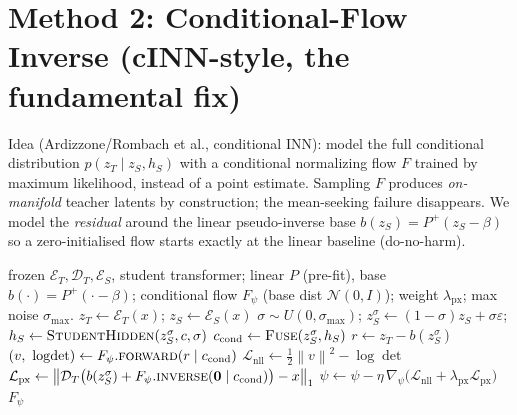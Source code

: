 \documentclass[11pt,a4paper]{article}
\newcommand{\N}{\mathcal{N}}
\newcommand{\Enc}{\mathcal{E}}
\newcommand{\Dec}{\mathcal{D}}
\newcommand{\norm}[1]{\left\lVert #1 \right\rVert}
\newcommand{\zT}{z_{T}}
\newcommand{\zS}{z_{S}}
\newcommand{\hS}{h_{S}}
\begin{document}
\section{Method 2: Conditional-Flow Inverse (cINN-style, the fundamental fix)}
\label{sec:flow}

Idea (Ardizzone/Rombach et al., conditional INN): model the full conditional distribution
$p(\zT\mid\zS,\hS)$ with a conditional normalizing flow $F$ trained by maximum likelihood,
instead of a point estimate. Sampling $F$ produces \emph{on-manifold} teacher latents by
construction; the mean-seeking failure disappears. We model the \emph{residual} around the
linear pseudo-inverse base $b(\zS)=P^{+}(\zS-\beta)$ so a zero-initialised flow starts exactly
at the linear baseline (do-no-harm).

\begin{algorithm}[h]
\caption{Conditional-Flow Inverse --- offline training (NLL)}
\label{alg:flow-train}
\begin{algorithmic}[1]
\Require frozen $\Enc_T,\Dec_T,\Enc_S$, student transformer; linear $P$ (pre-fit),
base $b(\cdot)=P^{+}(\cdot-\beta)$; conditional flow $F_\psi$ (base dist $\N(0,I)$);
weight $\lambda_{\mathrm{px}}$; max noise $\sigma_{\max}$.
  \State $\zT \gets \Enc_T(x)$; \quad $\zS \gets \Enc_S(x)$
  \State $\sigma\sim U(0,\sigma_{\max})$; \quad $\zS^{\sigma}\gets(1-\sigma)\zS+\sigma\varepsilon$;
         \quad $\hS \gets \textsc{StudentHidden}(\zS^{\sigma},c,\sigma)$
  \State $c_{\mathrm{cond}} \gets \textsc{Fuse}(\zS^{\sigma}, \hS)$ 
  \State $r \gets \zT - b(\zS^{\sigma})$ 
  \State $(v,\ \log\!\det) \gets F_\psi.\textsc{forward}(r \mid c_{\mathrm{cond}})$
  \State $\mathcal{L}_{\mathrm{nll}} \gets \tfrac{1}{2}\norm{v}^2 - \log\!\det$
         \Comment{$-\log p_\psi(\zT\mid\zS,\hS)$ up to const}
  \State $\mathcal{L}_{\mathrm{px}} \gets \norm{\Dec_T\big(b(\zS^{\sigma})+F_\psi.\textsc{inverse}(\mathbf{0}\mid c_{\mathrm{cond}})\big)-x}_1$
  \State $\psi \gets \psi - \eta\,\nabla_\psi\big(\mathcal{L}_{\mathrm{nll}}+\lambda_{\mathrm{px}}\mathcal{L}_{\mathrm{px}}\big)$
\EndFor
\State \Return $F_\psi$
\end{algorithmic}
\end{algorithm}
\end{document}
